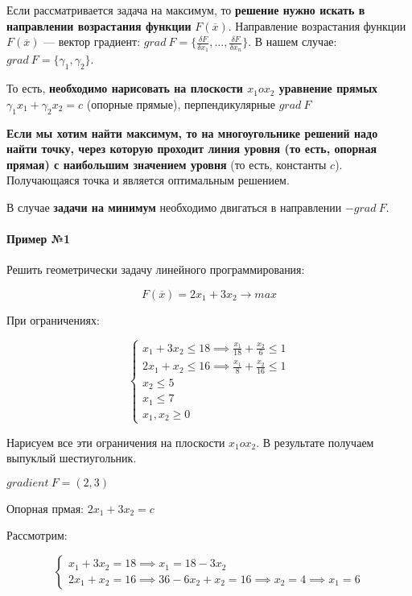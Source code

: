 \documentclass{article}
\begin{document}
Если рассматривается задача на максимум, то \textbf{решение нужно искать в направлении возрастания функции} $F(\overline{x})$. Направление возрастания функции $F(\overline{x})$ — вектор градиент: $grad \ F = \{ \frac{\delta F}{\delta x_1}, \dots, \frac{\delta F}{\delta x_{n}} \}$. В нашем случае: $grad \ F = \{ \gamma_1, \gamma_2 \}$.

То есть, \textbf{необходимо нарисовать на плоскости $x_1 o x_2$ уравнение прямых} $\gamma_1 x_1 + \gamma_2 x_2 = c$ (опорные прямые), перпендикулярные $grad \ F$

\textbf{Если мы хотим найти максимум, то на многоугольнике решений надо найти точку, через которую проходит линия уровня (то есть, опорная прямая) с наибольшим значением уровня} (то есть, константы $c$). Получающаяся точка и является оптимальным решением.

В случае \textbf{задачи на минимум} необходимо двигаться в направлении $- grad \ F$.

\paragraph{Пример №1}

Решить геометрически задачу линейного программирования:

$$F(\overline{x}) = 2 x_1 + 3x_2 \to max$$

При ограничениях:

$$
\begin{cases}
  x_1 + 3x_2 \le 18 \implies \frac{x_1}{18} + \frac{x_2}{6} \le 1\\
  2x_1 + x_2 \le 16 \implies \frac{x_1}{8} + \frac{x_2}{16} \le 1\\
  x_2 \le 5\\
  x_1 \le 7\\
  x_1, x_2 \ge 0  
\end{cases}
$$

Нарисуем все эти ограничения на плоскости $x_1 o x_2$. В результате получаем выпуклый шестиугольник.

$gradient \ F = (2, 3)$

Опорная прмая: $2x_1 + 3x_2 = c$

Рассмотрим:

$$
\begin{cases}
    x_1 + 3x_2 = 18 \implies x_1 = 18 - 3x_2 \\
    2x_1 + x_2 = 16 \implies 36 - 6x_2 + x_2 = 16 \implies x_2 = 4 \implies x_1 = 6
\end{cases}
$$
\end{document}
